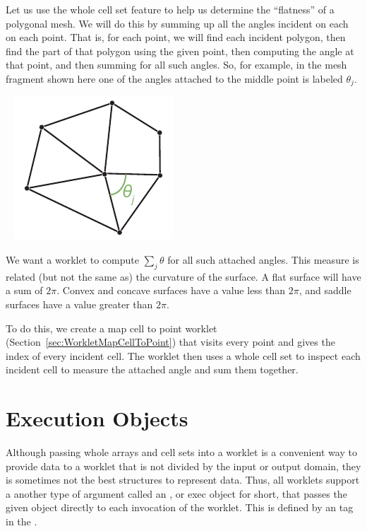 Let us use the whole cell set feature to help us determine the ``flatness'' of a polygonal mesh.
We will do this by summing up all the angles incident on each on each point.
That is, for each point, we will find each incident polygon, then find the part of that polygon using the given point, then computing the angle at that point, and then summing for all such angles.
So, for example, in the mesh fragment shown here one of the angles attached to the middle point is labeled $\theta_{j}$.

~\hfill
\includegraphics{images/PointIncidentAngles}
\hfill 

\noindent
We want a worklet to compute $\sum_{j} \theta$ for all such attached angles.
This measure is related (but not the same as) the curvature of the surface.
A flat surface will have a sum of $2\pi$.
Convex and concave surfaces have a value less than $2\pi$, and saddle surfaces have a value greater than $2\pi$.

To do this, we create a map cell to point worklet (Section~\ref{sec:WorkletMapCellToPoint}) that visits every point and gives the index of every incident cell.
The worklet then uses a whole cell set to inspect each incident cell to measure the attached angle and sum them together.



\section{Execution Objects}
\label{sec:ExecutionObjects}


Although passing whole arrays and cell sets into a worklet is a convenient way to provide data to a worklet that is not divided by the input or output domain, they is sometimes not the best structures to represent data.
Thus, all worklets support a another type of argument called an , or exec object for short, that passes the given object directly to each invocation of the worklet.
This is defined by an  tag in the \controlsignature.

